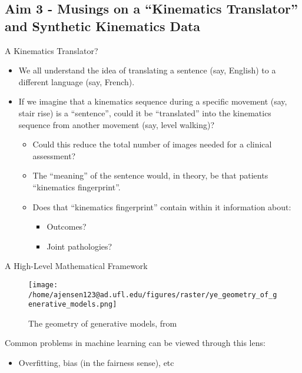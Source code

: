 \documentclass[presentation, aspectratio=1610]{beamer}
\begin{document}
\subsection{Aim 3 - Musings on a ``Kinematics Translator'' and Synthetic Kinematics Data}
\label{sec:org072a6b8}
\begin{frame}[label={sec:org94b2fc0}]{A Kinematics Translator?}
\begin{itemize}
\item We all understand the idea of translating a sentence (say, English) to a different language (say, French).
\item If we imagine that a kinematics sequence during a specific movement (say, stair rise) is a ``sentence'', could it be ``translated'' into the kinematics sequence from another movement (say, level walking)?
\begin{itemize}
\item Could this reduce the total number of images needed for a clinical assessment?
\item The ``meaning'' of the sentence would, in theory, be that patients ``kinematics fingerprint''.
\item Does that ``kinematics fingerprint'' contain within it information about:
\begin{itemize}
\item Outcomes?
\item Joint pathologies?
\end{itemize}
\end{itemize}
\end{itemize}
\end{frame}
\begin{frame}[label={sec:orgb2014ab}]{A High-Level Mathematical Framework}
\begin{figure}[htbp]
\centering
\texttt{[image: /home/ajensen123@ad.ufl.edu/figures/raster/ye\_geometry\_of\_generative\_models.png]}
\caption{The geometry of generative models, from \autocite{yeGeometryDeepLearning2022}}
\end{figure}

Common problems in machine learning can be viewed through this lens:
\begin{itemize}
\item Overfitting, bias (in the fairness sense), etc
\end{itemize}
\end{frame}
\end{document}
